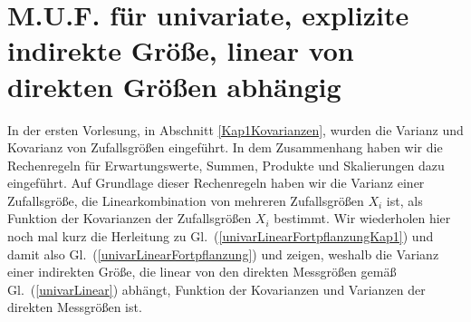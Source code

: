 \section{M.U.F. für univariate, explizite indirekte Größe, linear von direkten Größen abhängig}


In der ersten Vorlesung, in Abschnitt \ref{Kap1Kovarianzen}, wurden die Varianz und Kovarianz
von Zufallsgrößen eingeführt. In dem Zusammenhang haben wir die Rechenregeln für Erwartungswerte,
Summen, Produkte und Skalierungen dazu eingeführt. Auf Grundlage dieser Rechenregeln haben
wir die Varianz einer Zufallsgröße, die Linearkombination von mehreren Zufallsgrößen $X_i$ ist,
als Funktion der Kovarianzen der Zufallsgrößen $X_i$ bestimmt.
Wir wiederholen hier noch mal kurz die Herleitung zu Gl.~(\ref{univarLinearFortpflanzungKap1})
und damit also Gl.~(\ref{univarLinearFortpflanzung}) und zeigen,
weshalb die Varianz einer indirekten Größe, die linear
von den direkten Messgrößen gemäß Gl.~(\ref{univarLinear}) abhängt, Funktion der Kovarianzen
und Varianzen der direkten Messgrößen ist.

